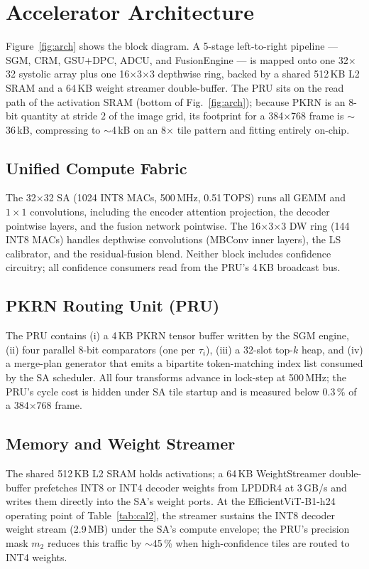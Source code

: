 \documentclass[journal,twocolumn]{IEEEtran}
\begin{document}
\section{Accelerator Architecture}
\label{sec:arch}

Figure~\ref{fig:arch} shows the block diagram. A 5-stage left-to-right pipeline --- SGM, CRM, GSU$+$DPC, ADCU, and FusionEngine --- is mapped onto one 32$\times$32 systolic array plus one 16$\times$3$\times$3 depthwise ring, backed by a shared 512\,KB L2 SRAM and a 64\,KB weight streamer double-buffer. The PRU sits on the read path of the activation SRAM (bottom of Fig.~\ref{fig:arch}); because PKRN is an 8-bit quantity at stride $2$ of the image grid, its footprint for a 384$\times$768 frame is $\sim$36\,kB, compressing to $\sim$4\,kB on an 8$\times$ tile pattern and fitting entirely on-chip.

\subsection{Unified Compute Fabric}
\label{sec:fabric}
The 32$\times$32 SA (1024 INT8 MACs, 500\,MHz, 0.51\,TOPS) runs all GEMM and $1\!\times\!1$ convolutions, including the encoder attention projection, the decoder pointwise layers, and the fusion network pointwise. The 16$\times$3$\times$3 DW ring (144 INT8 MACs) handles depthwise convolutions (MBConv inner layers), the LS calibrator, and the residual-fusion blend. Neither block includes confidence circuitry; all confidence consumers read from the PRU's 4\,KB broadcast bus.

\subsection{PKRN Routing Unit (PRU)}
\label{sec:pru}
The PRU contains (i) a 4\,KB PKRN tensor buffer written by the SGM engine, (ii) four parallel 8-bit comparators (one per $\tau_i$), (iii) a 32-slot top-$k$ heap, and (iv) a merge-plan generator that emits a bipartite token-matching index list consumed by the SA scheduler. All four transforms advance in lock-step at 500\,MHz; the PRU's cycle cost is hidden under SA tile startup and is measured below 0.3\,\% of a 384$\times$768 frame.

\subsection{Memory and Weight Streamer}
\label{sec:mem}
The shared 512\,KB L2 SRAM holds activations; a 64\,KB WeightStreamer double-buffer prefetches INT8 or INT4 decoder weights from LPDDR4 at 3\,GB/s and writes them directly into the SA's weight ports. At the EfficientViT-B1-h24 operating point of Table~\ref{tab:cal2}, the streamer sustains the INT8 decoder weight stream (2.9\,MB) under the SA's compute envelope; the PRU's precision mask $m_2$ reduces this traffic by $\sim$45\,\% when high-confidence tiles are routed to INT4 weights.
\end{document}
